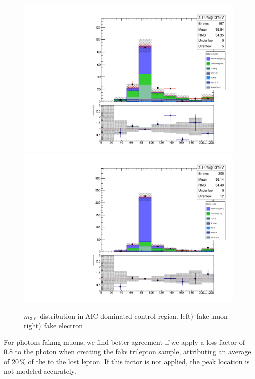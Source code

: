 \begin{figure}
\begin{center}
	\includegraphics[width=.5\textwidth]{Background/bkg_fakeLight/AIC_MLIGHTLEPTONS_muFake}%
	\includegraphics[width=.5\textwidth]{Background/bkg_fakeLight/AIC_MLIGHTLEPTONS_elFake}
	\caption{$m_{3\ell}$ distribution in AIC-dominated control region. \enskip left)~fake muon \enskip right)~fake electron
	\label{fig:fakeLight_AIC_MLEPTONS}}
\end{center}
\end{figure}

For photons faking muons, we find better agreement if we apply a loss factor of 0.8 to the photon \pt when creating the fake trilepton sample, attributing an average of 20\,\% of the \pt to the lost lepton. If this factor is not applied, the peak location is not modeled accurately.


